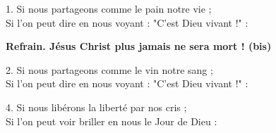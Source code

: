 1.
Si nous partageons comme le pain notre vie ;\\
Si l’on peut dire en nous voyant : "C’est Dieu vivant !" :

\textbf{
Refrain.
Jésus Christ plus jamais ne sera mort ! (bis)
}

2.
Si nous partageons comme le vin notre sang ;\\
Si l’on peut dire en nous voyant : "C’est Dieu vivant !" :

%
4.
Si nous libérons la liberté par nos cris ;\\
Si l’on peut voir briller en nous le Jour de Dieu :

%
